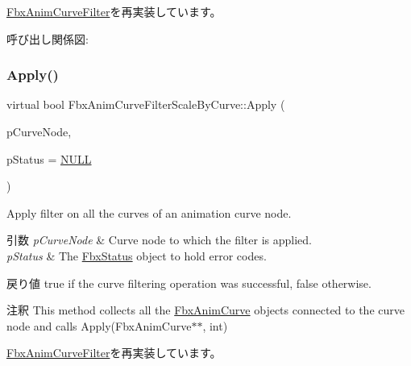 \hyperlink{class_fbx_anim_curve_filter_aca6a41fbc4d9019b20df7adccfa6ed3c}{Fbx\+Anim\+Curve\+Filter}を再実装しています。

呼び出し関係図\+:
\mbox{\label{class_fbx_anim_curve_filter_scale_by_curve_ac27bdff4d17273d2a767d188436e53f8}} 
\subsubsection{\texorpdfstring{Apply()}{Apply()}\hspace{0.1cm}{\footnotesize\ttfamily [4/5]}}
{\footnotesize\ttfamily virtual bool Fbx\+Anim\+Curve\+Filter\+Scale\+By\+Curve\+::\+Apply (\begin{DoxyParamCaption}\item[{\hyperlink{class_fbx_anim_curve_node}{Fbx\+Anim\+Curve\+Node} \&}]{p\+Curve\+Node,  }\item[{\hyperlink{class_fbx_status}{Fbx\+Status} $\ast$}]{p\+Status = {\ttfamily \hyperlink{fbxarch_8h_a070d2ce7b6bb7e5c05602aa8c308d0c4}{N\+U\+LL}} }\end{DoxyParamCaption})\hspace{0.3cm}{\ttfamily [virtual]}}

Apply filter on all the curves of an animation curve node. 
\begin{DoxyParams}{引数}
{\em p\+Curve\+Node} & Curve node to which the filter is applied. \\
\hline
{\em p\+Status} & The \hyperlink{class_fbx_status}{Fbx\+Status} object to hold error codes. \\
\hline
\end{DoxyParams}
\begin{DoxyReturn}{戻り値}
{\ttfamily true} if the curve filtering operation was successful, {\ttfamily false} otherwise. 
\end{DoxyReturn}
\begin{DoxyRemark}{注釈}
This method collects all the \hyperlink{class_fbx_anim_curve}{Fbx\+Anim\+Curve} objects connected to the curve node and calls Apply(\+Fbx\+Anim\+Curve$\ast$$\ast$, int) 
\end{DoxyRemark}


\hyperlink{class_fbx_anim_curve_filter_ad042b45c0675278fa49e61739b0825c2}{Fbx\+Anim\+Curve\+Filter}を再実装しています。

